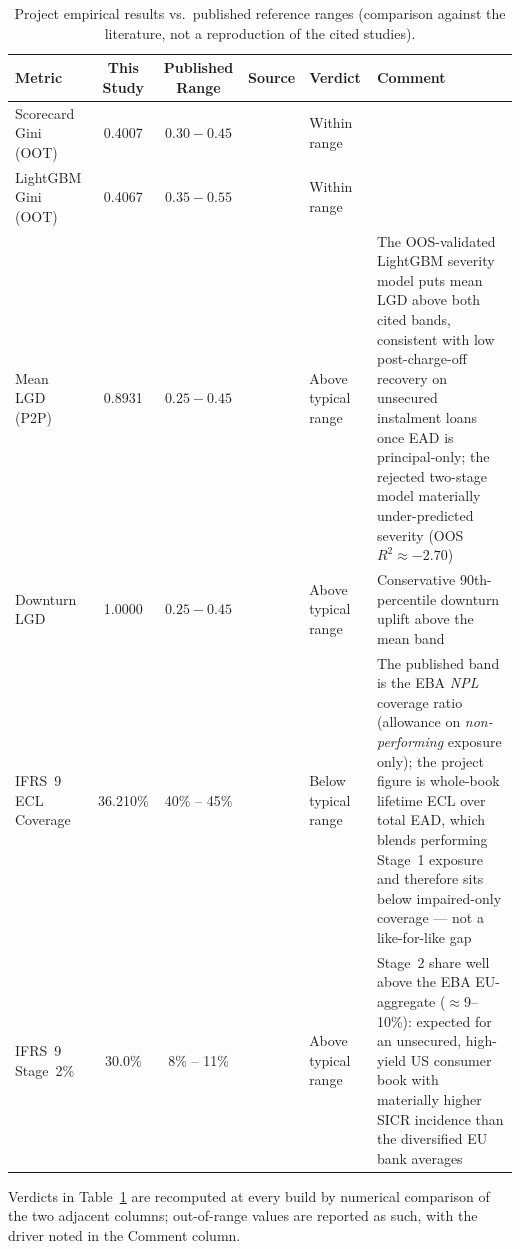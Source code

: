 \documentclass[11pt,a4paper]{article}
\begin{document}
\begin{table}[H]
\centering
\footnotesize
\setlength{\tabcolsep}{2.5pt}
\caption{Project empirical results vs.\ published reference ranges (comparison against the literature, not a reproduction of the cited studies).}
\label{tab:literature_benchmarks}
\begin{tabularx}{\linewidth}{p{2.2cm}ccp{2.2cm}lp{4.5cm}}
\toprule
\textbf{Metric} & \textbf{This Study} & \textbf{Published Range} & \textbf{Source} & \textbf{Verdict} & \textbf{Comment}\\
\midrule
Scorecard Gini (OOT) & 0.4007 & $0.30 - 0.45$
  & \cite{lessmann2015benchmarking} & Within range & \\
LightGBM Gini (OOT)  & 0.4067 & $0.35 - 0.55$
  & \cite{lessmann2015benchmarking} & Within range & \\
Mean LGD (P2P)       & 0.8931 & $0.25 - 0.45$
  & \cite{bellotti2012} & Above typical range & The OOS-validated LightGBM severity model puts mean LGD above both cited bands, consistent with low post-charge-off recovery on unsecured instalment loans once EAD is principal-only; the rejected two-stage model materially under-predicted severity (OOS $R^2 \approx -2.70$) \\
Downturn LGD         & 1.0000 & $0.25 - 0.45$
  & \cite{bellotti2012} & Above typical range & Conservative 90th-percentile downturn uplift above the mean band \\
IFRS~9 ECL Coverage  & 36.210\% & 40\% -- 45\%
  & \cite{eba2022} & Below typical range & The published band is the EBA \emph{NPL} coverage ratio (allowance on \emph{non-performing} exposure only); the project figure is whole-book lifetime ECL over total EAD, which blends performing Stage~1 exposure and therefore sits below impaired-only coverage --- not a like-for-like gap \\
IFRS~9 Stage~2\%     & 30.0\% & 8\% -- 11\%
  & \cite{eba2022} & Above typical range & Stage~2 share well above the EBA EU-aggregate ($\approx$9--10\%): expected for an unsecured, high-yield US consumer book with materially higher SICR incidence than the diversified EU bank averages \\
\bottomrule
\end{tabularx}
\end{table}

\footnotesize\noindent Verdicts in Table~\ref{tab:literature_benchmarks} are recomputed at every build by numerical comparison of the two adjacent columns; out-of-range values are reported as such, with the driver noted in the Comment column.\normalsize
\end{document}
